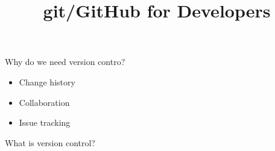\documentclass[aspectratio=169]{beamer}
\title{git/GitHub for Developers}
\institute{Engineers for Exploration, UC San Diego}
\begin{document}
\maketitle
\begin{frame}{Why do we need version contro?}
    \begin{itemize}
        \item Change history
        \item Collaboration
        \item Issue tracking
    \end{itemize}
\end{frame}
\begin{frame}{What is version control?}
\end{frame}
\end{document}
